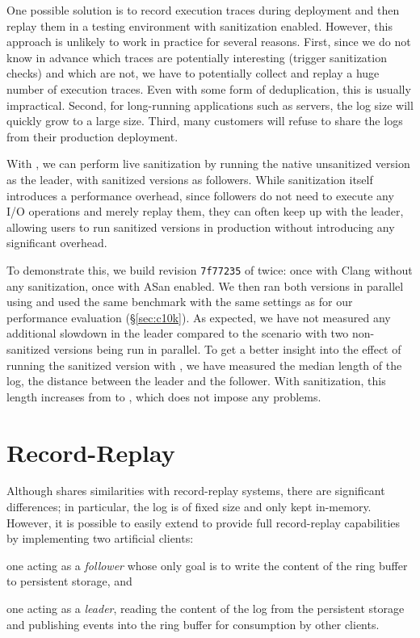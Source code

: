 One possible solution is to record execution traces during deployment
and then replay them in a testing environment with sanitization
enabled. However, this approach is unlikely to work in practice for
several reasons. First, since we do not know in advance which traces
are potentially interesting (\eg trigger sanitization checks) and
which are not, we have to potentially collect and replay a huge number
of execution traces. Even with some form of deduplication, this is
usually impractical. Second, for long-running applications such as
servers, the log size will quickly grow to a large size. Third, many
customers will refuse to share the logs from their production
deployment.

With \varan, we can perform live sanitization by running the native
unsanitized version as the leader, with sanitized versions as
followers.%
While sanitization itself introduces a performance overhead, since
followers do not need to execute any I/O operations and merely replay
them, they can often keep up with the leader, allowing users to run
sanitized versions in production without introducing any significant
overhead.

To demonstrate this, we build revision \lstinline`7f77235` of \redis
twice: once with Clang without any sanitization, once with ASan
enabled.  We then ran both versions in parallel using \varan and used
the same benchmark with the same settings as for our performance
evaluation (\S\ref{sec:c10k}). As expected, we have not measured any
additional slowdown in the leader compared to the scenario with two
non-sanitized versions being run in parallel. To get a better insight
into the effect of running the sanitized version with \varan, we have
measured the median length of the log, \ie the distance between the
leader and the follower. With sanitization, this length increases from
\redisNoSanitizationMedianLength to \redisSanitizationMedianLength,
which does not impose any problems.

\section{Record-Replay}
\label{sec:record_replay}

Although \varan shares similarities with record-replay systems, there are
significant differences; in particular, the log is of fixed size and
only kept in-memory.  However, it is possible to easily extend \varan to
provide full record-replay capabilities by implementing two artificial
clients:
\begin{inparaenum}[(i)]
\item one acting as a \emph{follower} whose only goal is to write the
  content of the ring buffer to persistent storage, and
\item one acting as a \emph{leader}, reading the content of the log
  from the persistent storage and publishing events into the ring
  buffer for consumption by other clients.
\end{inparaenum}

